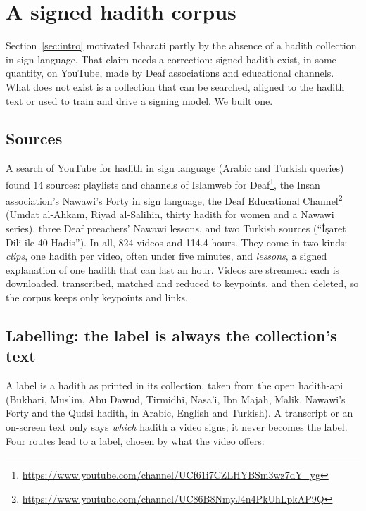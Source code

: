 \section{A signed hadith corpus}
\label{sec:hadith_corpus}

Section~\ref{sec:intro} motivated Isharati partly by the absence of a hadith collection in sign language. That claim
needs a correction: signed hadith exist, in some quantity, on YouTube, made by Deaf associations and educational
channels. What does not exist is a collection that can be searched, aligned to the hadith text or used to train and
drive a signing model. We built one.

\subsection{Sources}
A search of YouTube for hadith in sign language (Arabic and Turkish queries) found 14 sources: playlists and channels
of Islamweb for Deaf\footnote{\url{https://www.youtube.com/channel/UCf61i7CZLHYBSm3wz7dY_yg}}, the Insan association's
Nawawi's Forty in sign language, the Deaf Educational Channel\footnote{\url{https://www.youtube.com/channel/UC86B8NmyJ4n4PkUhLpkAP9Q}}
(Umdat al-Ahkam, Riyad al-Salihin, thirty hadith for women and a Nawawi series), three Deaf preachers' Nawawi lessons,
and two Turkish sources (``\.{I}\c{s}aret Dili ile 40 Hadis''). In all, 824 videos and 114.4 hours. They come in two
kinds: \emph{clips}, one hadith per video, often under five minutes, and \emph{lessons}, a signed explanation of one
hadith that can last an hour. Videos are streamed: each is downloaded, transcribed, matched and reduced to keypoints, and
then deleted, so the corpus keeps only keypoints and links.

\subsection{Labelling: the label is always the collection's text}
\label{sec:hadith_labels}
A label is a hadith as printed in its collection, taken from the open hadith-api \cite{hadithapi} (Bukhari, Muslim, Abu
Dawud, Tirmidhi, Nasa'i, Ibn Majah, Malik, Nawawi's Forty and the Qudsi hadith, in Arabic, English and Turkish). A
transcript or an on-screen text only says \emph{which} hadith a video signs; it never becomes the label. Four routes lead
to a label, chosen by what the video offers:

